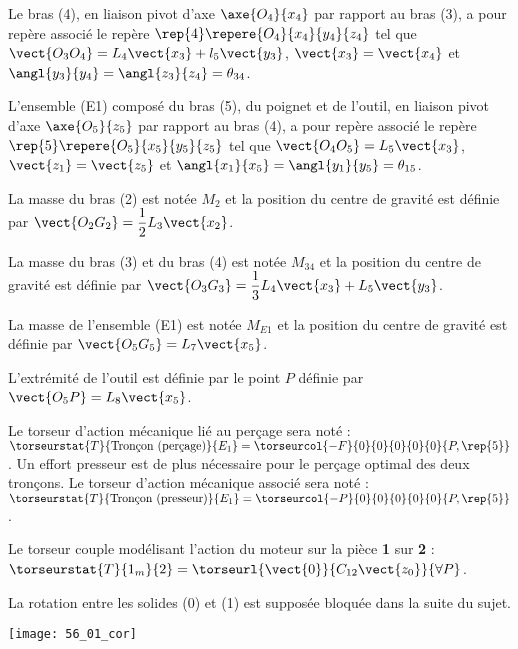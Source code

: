 Le bras (4), en liaison pivot d'axe $\axe{O_4}{x_4}$ par rapport au bras (3), a pour repère
associé le repère $\rep{4}\repere{O_4}{x_4}{y_4}{z_4}$ tel que $\vect{O_3 O_4} = L_4\vect{x_3} +l_5 \vect{y_3}$, $\vect{x_3}=\vect{x_4}$ et $\angl{y_3}{y_4}=\angl{z_3}{z_4}=\theta_{34}$.

L'ensemble (E1) composé du bras (5), du poignet et de l'outil, en liaison pivot d'axe $\axe{O_5}{z_5}$ par
rapport au bras (4), a pour repère associé le repère $\rep{5}\repere{O_5}{x_5}{y_5}{z_5}$ tel que $\vect{O_4O_5}=L_5\vect{x_3}$, $\vect{z_1}=\vect{z_5}$ et $\angl{x_1}{x_5}=\angl{y_1}{y_5}=\theta_{15}$.


La masse du bras (2) est notée $M_2$ et la position du centre de gravité est définie par $\vect{O_2G_2}=\dfrac{1}{2}L_3\vect{x_2}$.


La masse du bras (3) et du bras (4) est notée $M_{34}$ et la position du centre de gravité est définie par
$\vect{O_3G_3}=\dfrac{1}{3}L_4\vect{x_3}+L_5\vect{y_3}$.

La masse de l'ensemble (E1) est notée $M_{E1}$ et la position du centre de gravité est définie par
$\vect{O_5G_5}=L_7\vect{x_5}$. 

L’extrémité de l’outil est définie par le point $P$ définie par $\vect{O_5P}=L_8\vect{x_5}$. 

Le torseur d’action mécanique lié au perçage sera noté : $\torseurstat{T}{\text{Tronçon (perçage)}}{E_1}=\torseurcol{-F}{0}{0}{0}{0}{0}{P, \rep{5}}$.
Un effort presseur est de plus nécessaire pour le perçage optimal des deux tronçons. Le torseur
d’action mécanique associé sera noté : $\torseurstat{T}{\text{Tronçon (presseur)}}{E_1}=\torseurcol{-P}{0}{0}{0}{0}{0}{P, \rep{5}}$.

Le torseur couple modélisant l'action du moteur sur la pièce \textbf{1} sur \textbf{2} : $\torseurstat{T}{1_m}{2}=\torseurl{\vect{0}}{C_{12}\vect{z_0}}{\forall P}$.


La rotation entre les solides (0) et (1) est supposée bloquée dans la suite du sujet.


\fi

\ifprof
\begin{center}
\texttt{[image: 56\_01\_cor]}
\end{center}
\else
\fi



